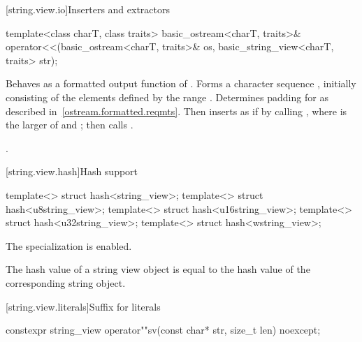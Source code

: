 [string.view.io]{Inserters and extractors}

%
\begin{itemdecl}
template<class charT, class traits>
  basic_ostream<charT, traits>&
    operator<<(basic_ostream<charT, traits>& os, basic_string_view<charT, traits> str);
\end{itemdecl}

\begin{itemdescr}
\pnum
\effects
Behaves as a formatted output
function of . Forms a character sequence
, initially consisting of the elements defined by the range
. Determines padding for 
as described in~\ref{ostream.formatted.reqmts}.
Then inserts  as if by calling
, where  is the larger
of  and ;
then calls .

\pnum
\returns
{}.
\end{itemdescr}

[string.view.hash]{Hash support}

%
%
%
%
%
\begin{itemdecl}
template<> struct hash<string_view>;
template<> struct hash<u8string_view>;
template<> struct hash<u16string_view>;
template<> struct hash<u32string_view>;
template<> struct hash<wstring_view>;
\end{itemdecl}

\begin{itemdescr}
\pnum
The specialization is enabled.
\begin{note}
The hash value of a string view object is equal to the hash value of
the corresponding string object.
\end{note}
\end{itemdescr}

[string.view.literals]{Suffix for  literals}

%
\begin{itemdecl}
constexpr string_view operator""sv(const char* str, size_t len) noexcept;
\end{itemdecl}

